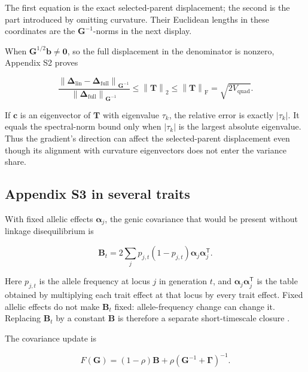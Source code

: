 \documentclass[11pt]{article}
\newcommand{\vect}[1]{\boldsymbol{#1}}
\newcommand{\mat}[1]{\mathbf{#1}}
\newcommand{\bGamma}{\boldsymbol{\Gamma}}
\newcommand{\Vquad}{\ensuremath{V_{\mathrm{quad}}}}
\newcommand{\norm}[1]{\left\lVert#1\right\rVert}
\begin{document}
The first equation is the exact selected-parent displacement; the second is
the part introduced by omitting curvature.  Their Euclidean lengths in these
coordinates are the $\mat G^{-1}$-norms in the next display.

When $\mat G^{1/2}\vect b\ne\vect0$, so the full displacement in the
denominator is nonzero, Appendix S2 proves

\begin{equation}
\frac{\norm{\vect\Delta_{\mathrm{lin}}-
\vect\Delta_{\mathrm{full}}}_{\mat G^{-1}}}
{\norm{\vect\Delta_{\mathrm{full}}}_{\mat G^{-1}}}
\leq\norm{\mat T}_2
\leq\norm{\mat T}_{\mathrm F}
=\sqrt{2\Vquad}.
\label{eq:guide-multi-bound}
\end{equation}

If $\vect c$ is an eigenvector of $\mat T$ with eigenvalue $\tau_k$, the relative error is exactly $|\tau_k|$. It equals the spectral-norm bound only when $|\tau_k|$ is the largest absolute eigenvalue. Thus the gradient's direction can affect the selected-parent displacement even though its alignment with curvature eigenvectors does not enter the variance share.

\subsection{Appendix S3 in several traits}
\label{sec:multi-s3}

With fixed allelic effects $\vect\alpha_j$, the genic covariance that would be
present without linkage disequilibrium is

\begin{equation}
\mat B_t=2\sum_j p_{j,t}(1-p_{j,t})
\vect\alpha_j\vect\alpha_j^{\mathsf T}.
\label{eq:guide-genic-baseline}
\end{equation}

Here $p_{j,t}$ is the allele frequency at locus $j$ in generation $t$, and
$\vect\alpha_j\vect\alpha_j^{\mathsf T}$ is the table obtained by multiplying
each trait effect at that locus by every trait effect.  Fixed allelic effects
do not make $\mat B_t$ fixed: allele-frequency change can change it.  Replacing
$\mat B_t$ by a constant $\mat B$ is therefore a separate short-timescale
closure \citep{WalshLynch2018}.

The covariance update is

\begin{equation}
F(\mat G)=(1-\rho)\mat B+\rho(\mat G^{-1}+\bGamma)^{-1}.
\end{equation}
\end{document}
